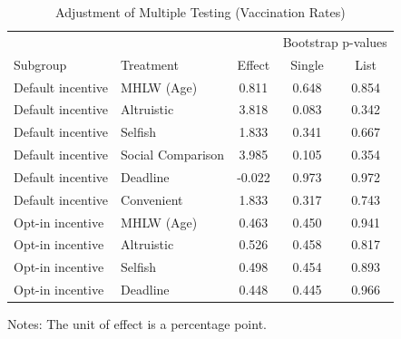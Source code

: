\documentclass[
    a4paper
]{article}
\begin{document}
\begin{table}

\caption{\label{tab:multiple-adjust-vacc-act}Adjustment of Multiple Testing (Vaccination Rates)}
\centering
\fontsize{9}{11}\selectfont
\begin{threeparttable}
\begin{tabular}[t]{llccc}
\toprule
\multicolumn{3}{c}{ } & \multicolumn{2}{c}{Bootstrap p-values} \\
\cmidrule(l{3pt}r{3pt}){4-5}
Subgroup & Treatment & Effect & Single & List\\
\midrule
Default incentive & MHLW (Age) & 0.811 & 0.648 & 0.854\\
Default incentive & Altruistic & 3.818 & 0.083 & 0.342\\
Default incentive & Selfish & 1.833 & 0.341 & 0.667\\
Default incentive & Social Comparison & 3.985 & 0.105 & 0.354\\
Default incentive & Deadline & -0.022 & 0.973 & 0.972\\
Default incentive & Convenient & 1.833 & 0.317 & 0.743\\
Opt-in incentive & MHLW (Age) & 0.463 & 0.450 & 0.941\\
Opt-in incentive & Altruistic & 0.526 & 0.458 & 0.817\\
Opt-in incentive & Selfish & 0.498 & 0.454 & 0.893\\
Opt-in incentive & Deadline & 0.448 & 0.445 & 0.966\\
\bottomrule
\end{tabular}
\begin{tablenotes}
\item Notes: The unit of effect is a percentage point.
\end{tablenotes}
\end{threeparttable}
\end{table}
\end{document}
